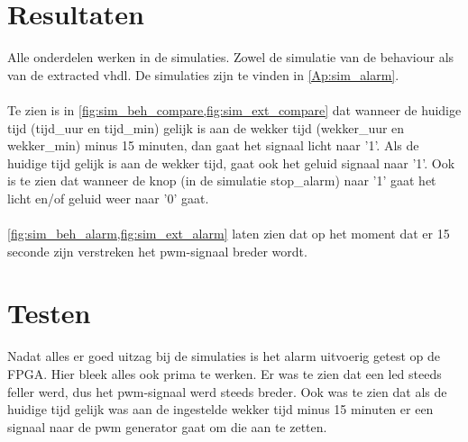 \section{Resultaten}
Alle onderdelen werken in de simulaties. Zowel de simulatie van de behaviour als van de extracted vhdl.
De simulaties zijn te vinden in \cref{Ap:sim_alarm}.
\\
\\
Te zien is in  \cref{fig:sim_beh_compare,fig:sim_ext_compare} dat wanneer de huidige tijd (tijd\_uur en tijd\_min) gelijk is aan de wekker tijd (wekker\_uur en wekker\_min) minus 15 minuten, dan gaat het signaal licht naar '1'. Als de huidige tijd gelijk is aan de wekker tijd, gaat ook het geluid signaal naar '1'.
Ook is te zien dat wanneer de knop (in de simulatie stop\_alarm) naar '1' gaat het licht en/of geluid weer naar '0' gaat.
\\
\\
\cref{fig:sim_beh_alarm,fig:sim_ext_alarm} laten zien dat op het moment dat er 15 seconde zijn verstreken het pwm-signaal breder wordt.

\section{Testen}
Nadat alles er goed uitzag bij de simulaties is het alarm uitvoerig getest op de FPGA.
Hier bleek alles ook prima te werken. Er was te zien dat een led steeds feller werd, dus het pwm-signaal werd steeds breder. Ook was te zien dat als de huidige tijd gelijk was aan de ingestelde wekker tijd minus 15 minuten er een signaal naar de pwm generator gaat om die aan te zetten.
